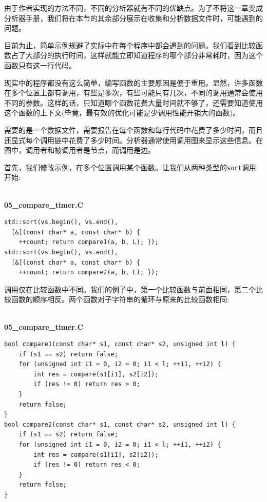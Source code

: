 由于作者实现的方法不同，不同的分析器就有不同的优缺点。为了不将这一章变成分析器手册，我们将在本节的其余部分展示在收集和分析数据文件时，可能遇到的问题。


目前为止，简单示例规避了实际中在每个程序中都会遇到的问题。我们看到比较函数占了大部分的执行时间，这样就能立即知道程序的哪个部分非常耗时，因为这个函数只有这一行代码。

现实中的程序都没有这么简单，编写函数的主要原因是便于重用。显然，许多函数在多个位置上都有调用，有些是多次，有些可能只有几次，不同的调用通常会使用不同的参数。这样的话，只知道哪个函数花费大量时间就不够了，还需要知道使用这个函数的上下文(毕竟，最有效的优化可能是少调用性能开销大的函数)。

需要的是一个数据文件，需要报告在每个函数和每行代码中花费了多少时间，而且还显式每个调用链中花费了多少时间。分析器通常使用调用图来显示这些信息。在图中，调用者和被调用者是节点，而调用是边。

首先，我们修改示例，在多个位置调用某个函数。让我们从两种类型的\texttt{sort}调用开始:

\hspace*{\fill} \\ %
\noindent
\textbf{05\_compare\_timer.C}
\begin{lstlisting}[style=styleCXX]
std::sort(vs.begin(), vs.end(),
  [&](const char* a, const char* b) {
	++count; return compare1(a, b, L); });
std::sort(vs.begin(), vs.end(),
  [&](const char* a, const char* b) {
	++count; return compare2(a, b, L); });
\end{lstlisting}

调用仅在比较函数中不同。我们的例子中，第一个比较函数与前面相同，第二个比较函数的顺序相反。两个函数对子字符串的循环与原来的比较函数相同:

\hspace*{\fill} \\ %
\noindent
\textbf{05\_compare\_timer.C}
\begin{lstlisting}[style=styleCXX]
bool compare1(const char* s1, const char* s2, unsigned int l) {
	if (s1 == s2) return false;
	for (unsigned int i1 = 0, i2 = 0; i1 < l; ++i1, ++i2) {
		int res = compare(s1[i1], s2[i2]);
		if (res != 0) return res > 0;
	}
	return false;
}
bool compare2(const char* s1, const char* s2, unsigned int l) {
	if (s1 == s2) return false;
	for (unsigned int i1 = 0, i2 = 0; i1 < l; ++i1, ++i2) {
		int res = compare(s1[i1], s2[i2]);
		if (res != 0) return res < 0;
	}
	return false;
}
\end{lstlisting}

